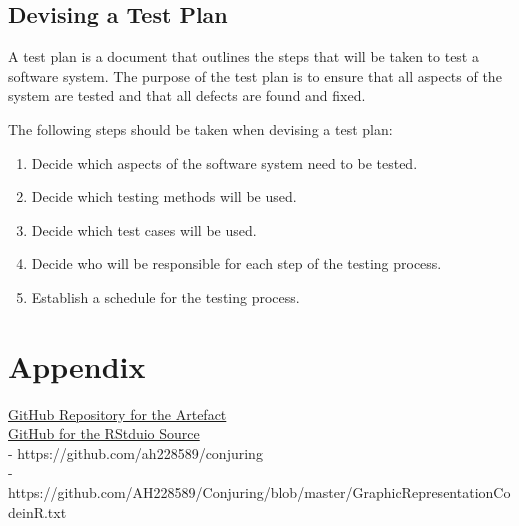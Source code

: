 \documentclass[lettersize,journal]{IEEEtran}
\begin{document}
\subsection {Devising a Test Plan}

A test plan is a document that outlines the steps that will be taken to test a software system. The purpose of the test plan is to ensure that all aspects of the system are tested and that all defects are found and fixed.

The following steps should be taken when devising a test plan:
\begin{enumerate}
\item Decide which aspects of the software system need to be tested.
\item Decide which testing methods will be used.
\item Decide which test cases will be used.
\item Decide who will be responsible for each step of the testing process.
\item Establish a schedule for the testing process.
\end{enumerate}


\section{Appendix}

\href{"https://github.com/ah228589/conjuring"}{GitHub Repository for the Artefact}\\
\href{"https://github.com/AH228589/Conjuring/blob/master/GraphicRepresentationCodeinR.txt"}{GitHub for the RStduio Source }\\
- https://github.com/ah228589/conjuring\\
- https://github.com/AH228589/Conjuring/blob/master/GraphicRepresentationCodeinR.txt\\



\end{document}
